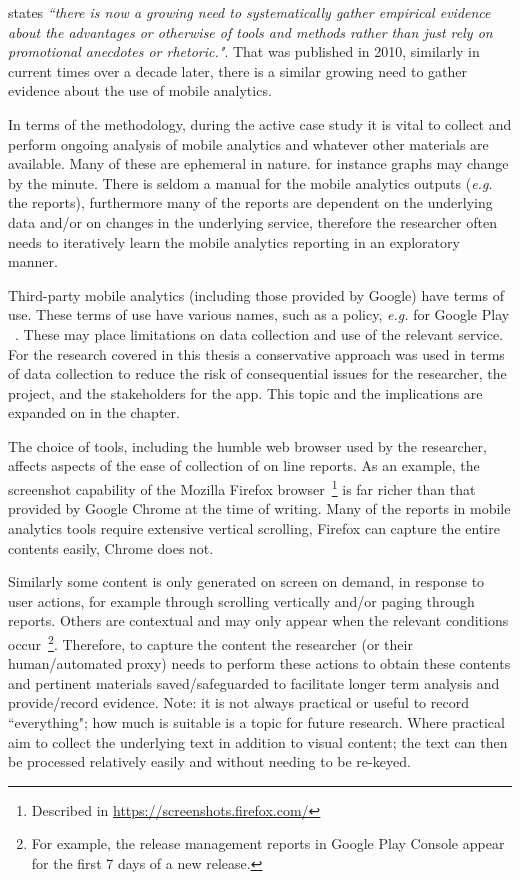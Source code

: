 \citet[p.250]{falessi2010_applying_ESE_to_sw_architecture_etc} states \emph{``there is now a growing need to systematically gather empirical evidence about the advantages or otherwise of tools and methods rather than just rely on promotional anecdotes or rhetoric."}. That was published in 2010, similarly in current times over a decade later, there is a similar growing need to gather evidence about the use of mobile analytics.

In terms of the methodology, during the active case study it is vital to collect and perform ongoing analysis of mobile analytics and whatever other materials are available. Many of these are ephemeral in nature. for instance graphs may change by the minute. There is seldom a manual for the mobile analytics outputs (\textit{e.g.} the reports), furthermore many of the reports are dependent on the underlying data and/or on changes in the underlying service, therefore the researcher often needs to iteratively learn the mobile analytics reporting in an exploratory manner. 

Third-party mobile analytics (including those provided by Google) have terms of use. These terms of use have various names, such as a policy, \textit{e.g.} for Google Play ~\citet{google_play_developer_policy_center}. These may place limitations on data collection and use of the relevant service. For the research covered in this thesis a conservative approach was used in terms of data collection to reduce the risk of consequential issues for the researcher, the project, and the stakeholders for the app. This topic and the implications are expanded on in the  chapter.

The choice of tools, including the humble web browser used by the researcher, affects aspects of the ease of collection of on line reports. As an example, the screenshot capability of the Mozilla Firefox browser~\footnote{Described in \url{https://screenshots.firefox.com/}} is far richer than that provided by Google Chrome at the time of writing. Many of the reports in mobile analytics tools require extensive vertical scrolling, Firefox can capture the entire contents easily, Chrome does not. 

Similarly some content is only generated on screen on demand, in response to user actions, for example through scrolling vertically and/or paging through reports. Others are contextual and may only appear when the relevant conditions occur~\footnote{For example, the release management reports in Google Play Console appear for the first 7 days of a new release.}. Therefore, to capture the content the researcher (or their human/automated proxy) needs to perform these actions to obtain these contents and pertinent materials saved/safeguarded to facilitate longer term analysis and provide/record evidence. Note: it is not always practical or useful to record ``everything"; how much is suitable is a topic for future research. Where practical aim to collect the underlying text in addition to visual content; the text can then be processed relatively easily and without needing to be re-keyed.



